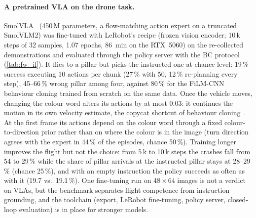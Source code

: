 \paragraph{A pretrained VLA on the drone task.} SmolVLA~\cite{shukor2025smolvla} (450\,M parameters, a
flow-matching action expert on a truncated SmolVLM2) was fine-tuned with LeRobot's recipe (frozen vision encoder;
10\,k steps of 32 samples, 1.07 epochs, \SI{86}{min} on the RTX~5060) on the re-collected demonstrations and
evaluated through the policy server with the BC protocol (\cref{tab:fw_il}). It flies to a pillar but picks the
instructed one at chance level: 19\,\% success executing 10 actions per chunk (27\,\% with 50, 12\,\% re-planning
every step), 45--66\,\% wrong pillar among four, against 80\,\% for the FiLM-CNN behaviour cloning trained from
scratch on the same data. Once the vehicle moves, changing the colour word alters its actions by at most 0.03: it
continues the motion in its own velocity estimate, the copycat shortcut of behaviour
cloning~\cite{dehaan2019causal}. At the first frame its actions depend on the colour word through a fixed
colour-to-direction prior rather than on where the colour is in the image (turn direction agrees with the expert in
44\,\% of the episodes, chance 50\,\%). Training longer improves the flight but not the choice: from 5\,k to
10\,k steps the crashes fall from 54 to 29\,\% while the share of pillar arrivals at the instructed pillar stays
at 28--29\,\% (chance 25\,\%), and with an empty instruction the policy succeeds as often as with it (19.7 vs.\
19.1\,\%). One fine-tuning run on $48\times64$ images is not a
verdict on VLAs, but the benchmark separates flight competence from instruction grounding, and the toolchain
(export, LeRobot fine-tuning, policy server, closed-loop evaluation) is in place for stronger models.
